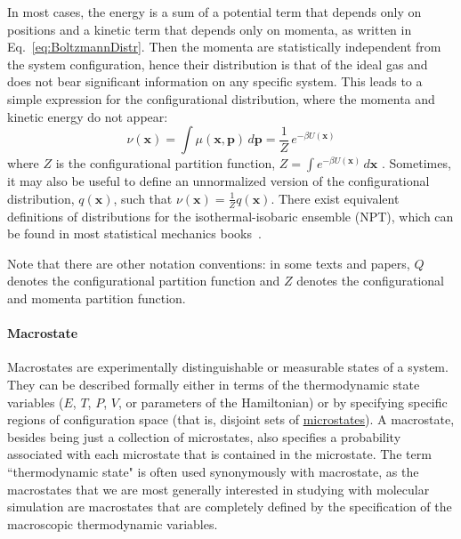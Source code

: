 \documentclass[9pt,review]{livecoms}
\newcommand{\vx}{\mathbf{x}}
\newcommand{\vp}{\mathbf{p}}
\begin{document}
In most cases, the energy is a sum of a potential term that depends only on positions and a kinetic term that depends only on momenta, as written in Eq.~\ref{eq:BoltzmannDistr}.
Then the momenta are statistically independent from the system configuration, hence their distribution is that of the ideal gas and does not bear significant information on any specific system.
This leads to a simple expression for the configurational distribution, where the momenta and kinetic energy do not appear:
\begin{equation}
\nu(\vx) = \int \mu(\vx, \vp) \, d\vp = \frac{1}{Z} \, e^{-\beta U(\vx)}
\end{equation}
where $Z$ is the configurational partition function, $ Z = \int e^{-\beta U(\vx)} \, d\vx$ . Sometimes, it may also be useful to define an unnormalized version of the configurational distribution, $q(\vx)$, such that $\nu(\vx) = \frac{1}{Z}q(\vx)$. There exist equivalent definitions of distributions for the isothermal-isobaric ensemble (NPT), which can be found in most statistical mechanics books~\cite{Zuckerman2010, Tuckerman2010}.

Note that there are other notation conventions: in some texts and papers, $Q$ denotes the configurational partition function and $Z$ denotes the configurational and momenta partition function.


\hypertarget{ref:Macrostate} {\paragraph{Macrostate}}

Macrostates are experimentally distinguishable or measurable states of a system.
They can be described formally either in terms of the thermodynamic state variables ($E$, $T$, $P$, $V$, or parameters of the Hamiltonian) or by specifying specific regions of configuration space (that is, disjoint sets of \hyperlink{ref:Microstate} {microstates}). A macrostate, besides being just a collection of microstates, also specifies a probability associated with each microstate that is contained in the microstate. The term ``thermodynamic state" is often used synonymously with macrostate, as the macrostates that we are most generally interested in studying with molecular simulation are macrostates that are completely defined by the specification of the macroscopic thermodynamic variables.
\end{document}
